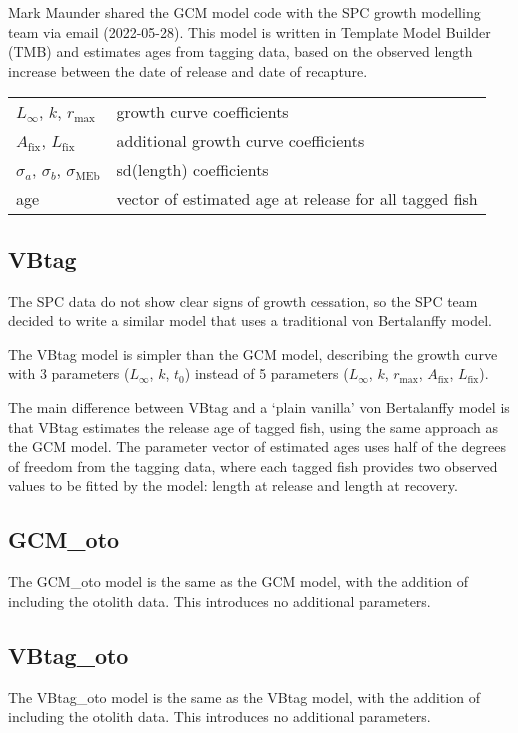 \documentclass[fleqn]{article}
\begin{document}
Mark Maunder shared the GCM model code with the SPC growth modelling team via
email (2022-05-28). This model is written in Template Model Builder (TMB) and
estimates ages from tagging data, based on the observed length increase between
the date of release and date of recapture.

\begin{tabular}{ll}
  $L_\infty$, $k$, $r_\mathrm{max}$ & growth curve coefficients\\[1ex]
  $A_\mathrm{fix}$, $L_\mathrm{fix}$ & additional growth curve
                                       coefficients\\[1ex]
  $\sigma_a$, $\sigma_b$, $\sigma_\mathrm{MEb}$ & sd(length) coefficients\\[1ex]
  age & vector of estimated age at release for all tagged fish\\[1ex]
\end{tabular}

\subsection*{VBtag}

The SPC data do not show clear signs of growth cessation, so the SPC team
decided to write a similar model that uses a traditional von Bertalanffy model.

The VBtag model is simpler than the GCM model, describing the growth curve with
3 parameters ($L_\infty$, $k$, $t_0$) instead of 5 parameters ($L_\infty$, $k$,
$r_\mathrm{max}$, $A_\mathrm{fix}$, $L_\mathrm{fix}$).

The main difference between VBtag and a `plain vanilla' von Bertalanffy model is
that VBtag estimates the release age of tagged fish, using the same approach as
the GCM model. The parameter vector of estimated ages uses half of the degrees
of freedom from the tagging data, where each tagged fish provides two observed
values to be fitted by the model: length at release and length at recovery.

\subsection*{GCM\_oto}

The GCM\_oto model is the same as the GCM model, with the addition of including
the otolith data. This introduces no additional parameters.

\subsection*{VBtag\_oto}

The VBtag\_oto model is the same as the VBtag model, with the addition of
including the otolith data. This introduces no additional parameters.
\end{document}

